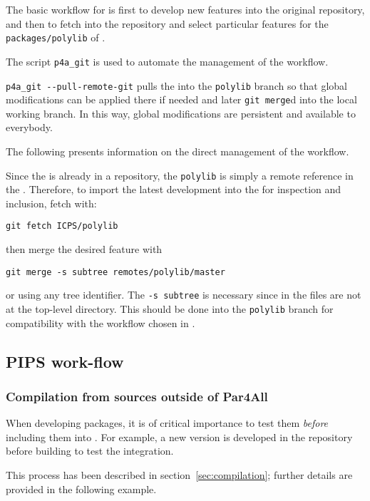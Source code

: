 \documentclass[a4paper]{article}
\begin{document}
The basic workflow for \Apolylib is first to develop new features into the
original \Apolylib{} \Agit repository, and then to fetch into the
\Apfa{} \Agit repository and select particular features for the
\texttt{packages/polylib} of \Apfa.

The script \verb|p4a_git| is used to automate the management of the
workflow.

\verb|p4a_git --pull-remote-git| pulls the \Apolylib into the
\texttt{polylib} branch so that global modifications can be applied there
if needed and later \texttt{git merge}d into the local working branch. In
this way, global modifications are persistent and available to everybody.

The following presents information on the direct management of the
\Apolylib workflow.

Since the \Apolylib is already in a \Agit repository, the
\texttt{polylib} is simply a remote reference in the \Apfa{} \Agit.
Therefore, to import the latest \Apolylib development into the \Apfa{}
\Agit for
inspection and inclusion, fetch \Apolylib with:
\begin{verbatim}
git fetch ICPS/polylib
\end{verbatim}

then merge the desired feature with
\begin{verbatim}
git merge -s subtree remotes/polylib/master
\end{verbatim}
or using any tree identifier. The \texttt{-s subtree} is necessary since in
\Apfa the \Apolylib files are not at the top-level directory. This should
be done into the \texttt{polylib} branch for compatibility with
the workflow chosen in \Apfa.


\subsection{PIPS work-flow}
\label{sec:pips-workflow}

\subsubsection{Compilation from sources outside of Par4All}
\label{sec:comp-from-sourc}

When developing \Apfa packages, it is of critical importance to test them
\emph{before} including them into \Apfa.
For example, a new \Apips version is developed in the
\Acri{} \Asvn repository before building \Apfa to test the integration.

This process has been described in section~\ref{sec:compilation};
further details are provided in the following example.
\end{document}

